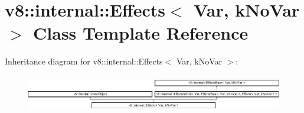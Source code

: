 \hypertarget{classv8_1_1internal_1_1_effects}{}\section{v8\+:\+:internal\+:\+:Effects$<$ Var, k\+No\+Var $>$ Class Template Reference}
\label{classv8_1_1internal_1_1_effects}
Inheritance diagram for v8\+:\+:internal\+:\+:Effects$<$ Var, k\+No\+Var $>$\+:\begin{figure}[H]
\begin{center}
\leavevmode
\includegraphics[height=1.615385cm]{classv8_1_1internal_1_1_effects}
\end{center}
\end{figure}
